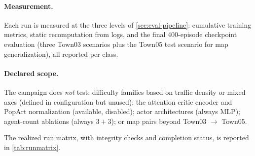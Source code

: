 \paragraph{Measurement.}
Each run is measured at the three levels of \cref{sec:eval-pipeline}:
cumulative training metrics, static recomputation from logs, and the
final 400-episode checkpoint evaluation (three Town03 scenarios plus the
Town05 test scenario for map generalization), all reported per class.

\paragraph{Declared scope.}
The campaign does \emph{not} test: difficulty families based on traffic
density or mixed axes (defined in configuration but unused); the
attention critic encoder and PopArt normalization (available, disabled);
actor architectures (always MLP); agent-count ablations (always
$3+3$); or map pairs beyond Town03 $\to$ Town05.

The realized run matrix, with integrity checks and completion status, is
reported in \cref{tab:runmatrix}.
